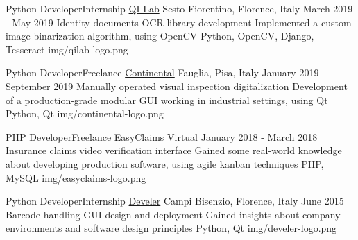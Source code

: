 \begin{cventries}
  \logocventry
    {Python Developer{\enskip\cdotp\enskip}Internship}
    {\href{https://www.qi-lab.it/}{QI-Lab}}
    {Sesto Fiorentino, Florence, Italy}
    {March 2019 - May 2019}
    {
      \cvexp
        {Identity documents OCR library development}
        {Implemented a custom image binarization algorithm, using OpenCV}
        {Python, OpenCV, Django, Tesseract}
    }
    {img/qilab-logo.png}

  \logocventry
    {Python Developer{\enskip\cdotp\enskip}Freelance}
    {\href{https://www.continental-pneumatici.it/auto}{Continental}}
    {Fauglia, Pisa, Italy}
    {January 2019 - September 2019}
    {
      \cvexp
        {Manually operated visual inspection digitalization}
        {Development of a production-grade modular GUI working in industrial settings, using Qt}
        {Python, Qt}
    }
    {img/continental-logo.png}

  \logocventry
    {PHP Developer{\enskip\cdotp\enskip}Freelance}
    {\href{https://www.easyclaims.eu}{EasyClaims}}
    {Virtual}
    {January 2018 - March 2018}
    {
      \cvexp
        {Insurance claims video verification interface}
        {Gained some real-world knowledge about developing production software, using agile kanban techniques}
        {PHP, MySQL}
    }
    {img/easyclaims-logo.png}

  \logocventry
    {Python Developer{\enskip\cdotp\enskip}Internship}
    {\href{https://www.develer.com/}{Develer}}
    {Campi Bisenzio, Florence, Italy}
    {June 2015}
    {
      \cvexp
        {Barcode handling GUI design and deployment}
        {Gained insights about company environments and software design principles}
        {Python, Qt}
    }
    {img/develer-logo.png}

\end{cventries}
